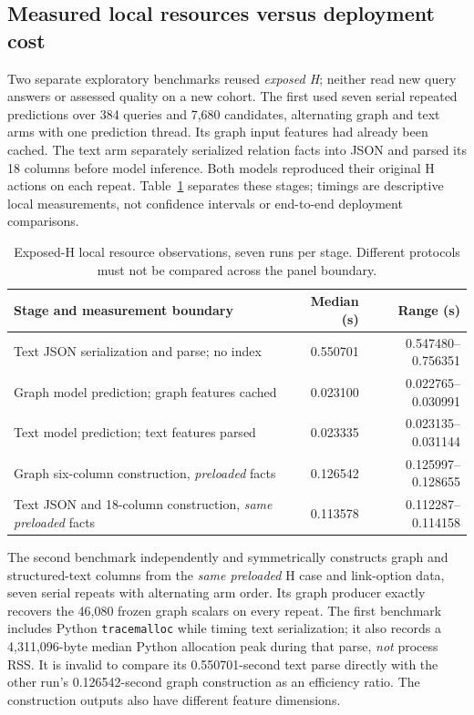  \subsection{Measured local resources versus deployment cost}\label{app:resources}
 Two separate exploratory benchmarks reused \emph{exposed H}; neither read
 new query answers or assessed quality on a new cohort. The first used
 seven serial repeated predictions over 384 queries and 7,680 candidates,
 alternating graph and text arms with one prediction thread. Its graph
 input features had already been cached. The text arm separately
 serialized relation facts into JSON and parsed its 18 columns before
 model inference. Both models reproduced their original H actions on
 each repeat. Table~\ref{tab:resource} separates these stages; timings
 are descriptive local measurements, not confidence intervals or
 end-to-end deployment comparisons.

 \begin{table}[h]
 \centering
 \caption{Exposed-H local resource observations, seven runs per stage.
 Different protocols must not be compared across the panel boundary.}
 \label{tab:resource}\small
 \begin{tabular}{p{8.7cm}rr}
 \toprule
 Stage and measurement boundary & Median (s) & Range (s) \\
 \midrule
 Text JSON serialization and parse; no index & 0.550701 & 0.547480--0.756351 \\
 Graph model prediction; graph features cached & 0.023100 & 0.022765--0.030991 \\
 Text model prediction; text features parsed & 0.023335 & 0.023135--0.031144 \\
 \midrule
 Graph six-column construction, \emph{preloaded} facts & 0.126542 & 0.125997--0.128655 \\
 Text JSON and 18-column construction, \emph{same preloaded} facts & 0.113578 & 0.112287--0.114158 \\
 \bottomrule
 \end{tabular}
 \end{table}

 The second benchmark independently and symmetrically constructs graph
 and structured-text columns from the \emph{same preloaded} H case and
 link-option data, seven serial repeats with alternating arm order. Its
 graph producer exactly recovers the 46,080 frozen graph scalars on every
 repeat. The first benchmark includes Python \texttt{tracemalloc} while
 timing text serialization; it also records a 4,311,096-byte median
 Python allocation peak during that parse, \emph{not} process RSS.
 It is invalid to compare its 0.550701-second text parse directly with
 the other run's 0.126542-second graph construction as an efficiency
 ratio. The construction outputs also have different feature dimensions.

